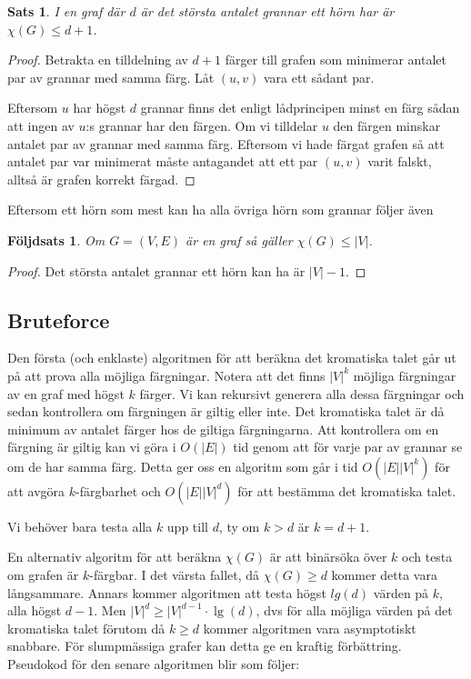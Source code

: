 \documentclass[a4paper]{report}
\newtheorem{theorem}{Sats}
\newtheorem{corollary}{Följdsats}
\begin{document}
\begin{theorem}
    I en graf där $d$ är det största antalet grannar ett hörn har är $\chi(G) \le d + 1$.
\end{theorem}

\begin{proof}
    Betrakta en tilldelning av $d+1$ färger till grafen som minimerar antalet par av grannar med samma färg. Låt $(u, v)$ vara ett sådant par.

    Eftersom $u$ har högst $d$ grannar finns det enligt lådprincipen minst en färg sådan att ingen av $u$:s grannar har den färgen. Om vi tilldelar
    $u$ den färgen minskar antalet par av grannar med samma färg. Eftersom vi hade färgat grafen så att antalet par var minimerat måste
    antagandet att ett par $(u, v)$ varit falskt, alltså är grafen korrekt färgad.
\end{proof}

Eftersom ett hörn som mest kan ha alla övriga hörn som grannar följer även

\begin{corollary}
    Om $G = (V, E)$ är en graf så gäller $\chi(G)\le|V|$.
\end{corollary}
\begin{proof}
    Det största antalet grannar ett hörn kan ha är $|V| - 1$.
\end{proof}

\subsection{Bruteforce}
Den första (och enklaste) algoritmen för att beräkna det kromatiska talet går ut på att prova alla möjliga färgningar. Notera att det finns $|V|^k$ möjliga färgningar av en graf med högst $k$ färger. Vi kan rekursivt generera alla dessa färgningar och sedan kontrollera om färgningen är giltig eller inte. Det kromatiska talet är då minimum av antalet färger hos de giltiga färgningarna. Att kontrollera om en färgning är giltig kan vi göra i $O(|E|)$ tid genom att för varje par av grannar se om de har samma färg. Detta ger oss en algoritm som går i tid $O(|E||V|^k)$ för att avgöra $k$-färgbarhet och $O(|E||V|^{d})$ för att bestämma det kromatiska talet.

Vi behöver bara testa alla $k$ upp till $d$, ty om $k > d$ är $k = d + 1$.

En alternativ algoritm för att beräkna $\chi(G)$ är att binärsöka över $k$ och testa om grafen är $k$-färgbar. I det värsta fallet, då $\chi(G) \ge d$ kommer detta vara långsammare.
Annars kommer algoritmen att testa högst $lg (d)$ värden på $k$, alla högst $d-1$. Men $|V|^{d} \ge |V|^{d-1}\cdot{\lg(d)}$, dvs för alla möjliga värden på
det kromatiska talet förutom då $k \ge d$ kommer algoritmen vara asymptotiskt snabbare. För slumpmässiga grafer kan detta ge en kraftig förbättring. Pseudokod
för den senare algoritmen blir som följer:
\end{document}
